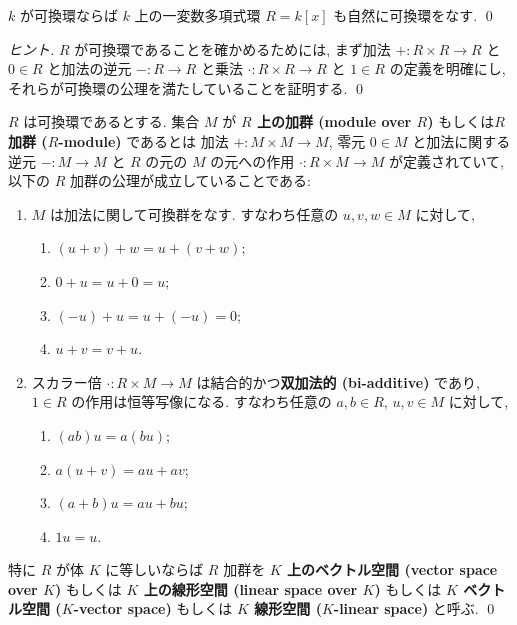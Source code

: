 \documentclass[12pt,twoside]{jarticle}
\begin{document}

\begin{question}[可換環上の多項式環]
  $k$ が可換環ならば $k$ 上の一変数多項式環 $R=k[x]$ も自然に可換環をなす.
  \qed
\end{question}

\begin{proof}[ヒント]
  $R$ が可換環であることを確かめるためには,
  まず加法 $+:R\times R\to R$ 
  と $0\in R$
  と加法の逆元 $-:R\to R$
  と乗法 $\cdot:R\times R\to R$
  と $1\in R$ の定義を明確にし, 
  それらが可換環の公理を満たしていることを証明する.
  \qed
\end{proof}


\begin{definition}[可換環上の加群と体上のベクトル空間]
  $R$ は可換環であるとする.
  集合 $M$ が {\bf $R$ 上の加群 (module over $R$)} 
  もしくは{\bf $R$ 加群 ($R$-module)} であるとは
  加法 $+:M\times M\to M$, 零元 $0\in M$ 
  と加法に関する逆元 $-:M\to M$ 
  と $R$ の元の $M$ の元への作用 $\cdot:R\times M\to M$ が定義されていて, 
  以下の $R$ 加群の公理が成立していることである:
  \begin{enumerate}
  \item $M$ は加法に関して可換群をなす. 
    すなわち任意の $u,v,w\in M$ に対して,
    \begin{enumerate}
    \item $(u + v) + w = u + (v + w)$;
    \item $0 + u = u + 0 = u$;
    \item $(-u) + u = u + (-u) = 0$;
    \item $u + v = v + u$.
    \end{enumerate}
  \item スカラー倍 $\cdot:R\times M\to M$ は結合的かつ{\bf 双加法的 
      (bi-additive)} であり, $1\in R$ の作用は恒等写像になる.
    すなわち任意の $a,b\in R$, $u,v\in M$ に対して,
    \begin{enumerate}
    \item $(ab)u = a(bu)$;
    \item $a(u + v) = au + av$;
    \item $(a + b)u = au + bu$;
    \item $1u = u$.
    \end{enumerate}
  \end{enumerate}
  特に $R$ が体 $K$ に等しいならば $R$ 加群を
  {\bf $K$ 上のベクトル空間 (vector space over $K$)} もしくは
  {\bf $K$ 上の線形空間 (linear space over $K$)} もしくは
  {\bf $K$ ベクトル空間 ($K$-vector space)} もしくは
  {\bf $K$ 線形空間 ($K$-linear space)} と呼ぶ.
  \qed
\end{definition}
\end{document}
